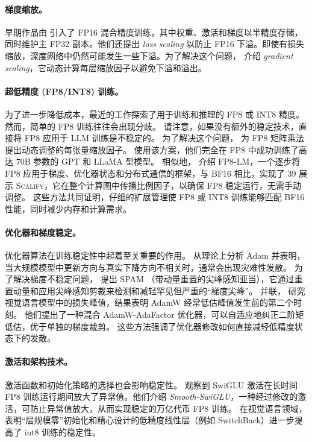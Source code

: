 \documentclass{article} %
\begin{document}
\paragraph{梯度缩放。}
早期作品由 \citet{micikevicius2017mixed} 引入了 FP16 混合精度训练，其中权重、激活和梯度以半精度存储，同时维护主 FP32 副本。他们还提出 \textit{loss scaling} 以防止 FP16 下溢。即使有损失缩放，深度网络中仍然可能发生一些下溢。为了解决这个问题， \citet{zhao2021reducing} 介绍 \textit{gradient scaling}，它动态计算每层缩放因子以避免下溢和溢出。

\paragraph{超低精度 (FP8/INT8) 训练。}
为了进一步降低成本，最近的工作探索了用于训练和推理的 FP8 或 INT8 精度。
然而，简单的 FP8 训练往往会出现分歧。 \citet{lee2024fp8} 请注意，如果没有额外的稳定技术，直接将 FP8 应用于 LLM 训练是不稳定的。
为了解决这个问题， \citet{perez2023training} 为 FP8 矩阵乘法提出动态调整的每张量缩放因子。 
使用该方案，他们完全在 FP8 中成功训练了高达 70B 参数的 GPT 和 LLaMA 型模型。
相似地， \citet{peng2023fp8} 介绍 \textsc{FP8-LM}，一个逐步将 FP8 应用于梯度、优化器状态和分布式通信的框架，与 BF16 相比，实现了 39%
\citet{balancca2024scalify} 展示 \textsc{Scalify}，它在整个计算图中传播比例因子，以确保 FP8 稳定运行，无需手动调整。
这些方法共同证明，仔细的扩展管理使 FP8 或 INT8 训练能够匹配 BF16 性能，同时减少内存和计算需求。

\paragraph{优化器和梯度稳定。}
优化器算法在训练稳定性中起着至关重要的作用。
\citet{molybog2023theory} 从理论上分析 Adam 并表明，当大规模模型中更新方向与真实下降方向不相关时，通常会出现灾难性发散。
为了解决梯度不稳定问题， \citet{huang2025spam} 提出 \textsc{SPAM} （带动量重置的尖峰感知亚当），它通过重置动量和应用尖峰感知剪裁来检测和减轻罕见但严重的“梯度尖峰”。 
并联， \citet{wortsman2023stable} 研究视觉语言模型中的损失峰值，结果表明 AdamW 经常低估峰值发生前的第二个时刻。 
他们提出了一种混合 AdamW-AdaFactor 优化器，可以自适应地纠正二阶矩低估，优于单独的梯度裁剪。
这些方法强调了优化器修改如何直接减轻低精度状态下的发散。

\paragraph{激活和架构技术。}
激活函数和初始化策略的选择也会影响稳定性。
\citet{fishman2024scaling} 观察到 SwiGLU 激活在长时间 FP8 训练运行期间放大了异常值。他们介绍 \textit{Smooth-SwiGLU}，一种经过修改的激活，可防止异常值放大，从而实现稳定的万亿代币 FP8 训练。
在视觉语言领域， \citet{wortsman2023stable} 表明“层规模零”初始化和精心设计的低精度线性层（例如 SwitchBack）进一步提高了 int8 训练的稳定性。
\end{document}
